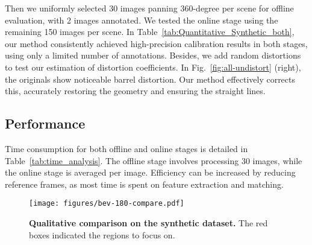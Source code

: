 Then we uniformly selected 30 images panning 360-degree per scene for offline evaluation, with 2 images annotated. We tested the online stage using the remaining 150 images per scene. In Table~\ref{tab:Quantitative_Synthetic_both}, our method consistently achieved high-precision  calibration results in both stages, using only a limited number of annotations. Besides, we add random distortions to test our estimation of distortion coefficients. In Fig.~\ref{fig:all-undistort} (right), the originals show noticeable barrel distortion. Our method effectively corrects this, accurately restoring the geometry and ensuring the straight lines.

\subsection{Performance}

Time consumption for both offline and online stages is detailed in Table~\ref{tab:time_analysis}. The offline stage involves processing 30 images, while the online stage is averaged per image. Efficiency can be increased by reducing reference frames, as most time is spent on feature extraction and matching.


\begin{figure}[!t]
    \centering
    \texttt{[image: figures/bev-180-compare.pdf]}
    \caption{\textbf{Qualitative comparison on the synthetic dataset.} The red boxes indicated the regions to focus on.}
    \label{fig:bev-180-compare}
\end{figure}

